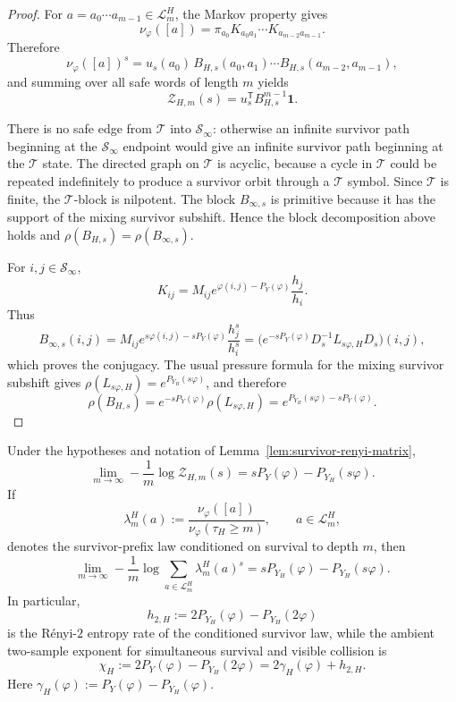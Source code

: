 \begin{proof}
For \(a=a_0\cdots a_{m-1}\in\mathcal L_m^H\), the Markov property gives
\[
  \nu_\varphi([a])
  = \pi_{a_0}K_{a_0a_1}\cdots K_{a_{m-2}a_{m-1}}.
\]
Therefore
\[
  \nu_\varphi([a])^s
  = u_s(a_0)\,
    B_{H,s}(a_0,a_1)\cdots B_{H,s}(a_{m-2},a_{m-1}),
\]
and summing over all safe words of length \(m\) yields
\[
  \mathcal Z_{H,m}(s)=u_s^{\mathsf T}B_{H,s}^{m-1}\mathbf 1.
\]

There is no safe edge from \(\mathcal T\) into \(\mathcal S_\infty\):
otherwise an infinite survivor path beginning at the \(\mathcal S_\infty\)
endpoint would give an infinite survivor path beginning at the
\(\mathcal T\) state.  The directed graph on \(\mathcal T\) is acyclic,
because a cycle in \(\mathcal T\) could be repeated indefinitely to
produce a survivor orbit through a \(\mathcal T\) symbol.  Since
\(\mathcal T\) is finite, the \(\mathcal T\)-block is nilpotent.  The
block \(B_{\infty,s}\) is primitive because it has the support of the
mixing survivor subshift.  Hence the block decomposition above holds and
\(\rho(B_{H,s})=\rho(B_{\infty,s})\).

For \(i,j\in\mathcal S_\infty\),
\[
  K_{ij}
  = M_{ij}e^{\varphi(i,j)-P_Y(\varphi)}\frac{h_j}{h_i}.
\]
Thus
\[
  B_{\infty,s}(i,j)
  = M_{ij}e^{s\varphi(i,j)-sP_Y(\varphi)}
    \frac{h_j^s}{h_i^s}
  = \bigl(e^{-sP_Y(\varphi)}D_s^{-1}
     L_{s\varphi,H}D_s\bigr)(i,j),
\]
which proves the conjugacy.  The usual pressure formula for the mixing
survivor subshift gives
\(\rho(L_{s\varphi,H})=e^{P_{Y_H}(s\varphi)}\), and therefore
\[
  \rho(B_{H,s})
  =e^{-sP_Y(\varphi)}\rho(L_{s\varphi,H})
  =e^{P_{Y_H}(s\varphi)-sP_Y(\varphi)}.
\]
\end{proof}

\begin{corollary}
\label{cor:survivor-renyi-pressure}
\label{cor:main-renyi}
Under the hypotheses and notation of
Lemma~\ref{lem:survivor-renyi-matrix},
\[
  \lim_{m\to\infty}
  -\frac1m\log \mathcal Z_{H,m}(s)
  = sP_Y(\varphi)-P_{Y_H}(s\varphi).
\]
If
\[
  \lambda_m^H(a)
  := \frac{\nu_\varphi([a])}{\nu_\varphi(\tau_H\ge m)},
  \qquad a\in\mathcal L_m^H,
\]
denotes the survivor-prefix law conditioned on survival to depth \(m\),
then
\[
  \lim_{m\to\infty}
  -\frac1m\log
  \sum_{a\in\mathcal L_m^H}\lambda_m^H(a)^s
  = sP_{Y_H}(\varphi)-P_{Y_H}(s\varphi).
\]
In particular,
\[
  h_{2,H}:=2P_{Y_H}(\varphi)-P_{Y_H}(2\varphi)
\]
is the R\'enyi-\(2\) entropy rate of the conditioned survivor law, while
the ambient two-sample exponent for simultaneous survival and visible
collision is
\[
  \chi_H:=2P_Y(\varphi)-P_{Y_H}(2\varphi)
        = 2\gamma_H(\varphi)+h_{2,H}.
\]
Here \(\gamma_H(\varphi):=P_Y(\varphi)-P_{Y_H}(\varphi)\).
\end{corollary}

